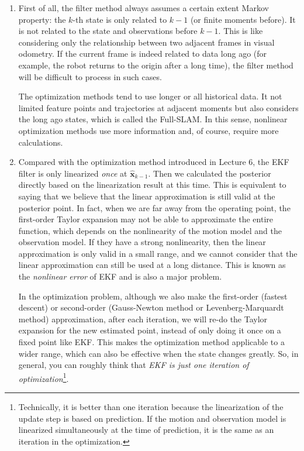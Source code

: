 \begin{enumerate}
	\item 
	First of all, the filter method always assumes a certain extent Markov property: the $k$-th state is only related to $k-1$ (or finite moments before). It is not related to the state and observations before $k-1$. This is like considering only the relationship between two adjacent frames in visual odometry. If the current frame is indeed related to data long ago (for example, the robot returns to the origin after a long time), the filter method will be difficult to process in such cases.
	
	The optimization methods tend to use longer or all historical data. It not limited feature points and trajectories at adjacent moments but also considers the long ago states, which is called the Full-SLAM. In this sense, nonlinear optimization methods use more information and, of course, require more calculations.
	
	\item 
	Compared with the optimization method introduced in Lecture 6, the EKF filter is only linearized \textit{once} at $\mathbf{\hat{x}}_{k-1}$. Then we calculated the posterior directly based on the linearization result at this time. This is equivalent to saying that we believe that the linear approximation is still valid at the posterior point. In fact, when we are far away from the operating point, the first-order Taylor expansion may not be able to approximate the entire function, which depends on the nonlinearity of the motion model and the observation model. If they have a strong nonlinearity, then the linear approximation is only valid in a small range, and we cannot consider that the linear approximation can still be used at a long distance. This is known as the \textit{nonlinear error} of EKF and is also a major problem.
	
	In the optimization problem, although we also make the first-order (fastest descent) or second-order (Gauss-Newton method or Levenberg-Marquardt method) approximation, after each iteration, we will re-do the Taylor expansion for the new estimated point, instead of only doing it once on a fixed point like EKF. This makes the optimization method applicable to a wider range, which can also be effective when the state changes greatly. So, in general, you can roughly think that \textit{EKF is just one iteration of optimization}\footnote{Technically, it is better than one iteration because the linearization of the update step is based on prediction. If the motion and observation model is linearized simultaneously at the time of prediction, it is the same as an iteration in the optimization. }.
	

\end{enumerate}

